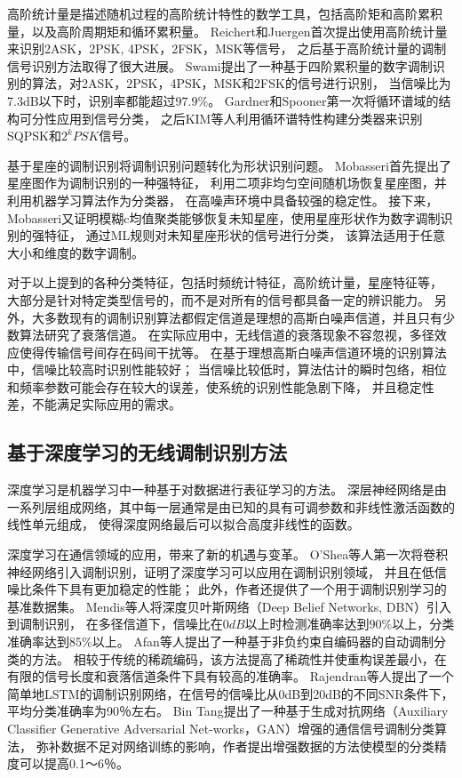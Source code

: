 高阶统计量是描述随机过程的高阶统计特性的数学工具，包括高阶矩和高阶累积量，以及高阶周期矩和循环累积量。
Reichert和Juergen首次提出使用高阶统计量来识别2ASK，2PSK, 4PSK，2FSK，MSK等信号，
之后基于高阶统计量的调制信号识别方法取得了很大进展\cite{reichert1992automatic}。
Swami提出了一种基于四阶累积量的数字调制识别的算法，对2ASK，2PSK，4PSK，MSK和2FSK的信号进行识别，
当信噪比为7.3dB以下时，识别率都能超过$97.9\%$\cite{swami2000hierarchical}。
Gardner和Spooner第一次将循环谱域的结构可分性应用到信号分类，
之后KIM等人利用循环谱特性构建分类器来识别SQPSK和$2^kPSK$信号。\par

基于星座的调制识别将调制识别问题转化为形状识别问题。
Mobasseri首先提出了星座图作为调制识别的一种强特征，
利用二项非均匀空间随机场恢复星座图，并利用机器学习算法作为分类器，
在高噪声环境中具备较强的稳定性\cite{mobasseri1999constellation}。
接下来，Mobasseri又证明模糊c均值聚类能够恢复未知星座，使用星座形状作为数字调制识别的强特征，
通过ML规则对未知星座形状的信号进行分类，
该算法适用于任意大小和维度的数字调制\cite{mobasseri2000digital}。\par
 
对于以上提到的各种分类特征，包括时频统计特征，高阶统计量，星座特征等，
大部分是针对特定类型信号的，而不是对所有的信号都具备一定的辨识能力。
另外，大多数现有的调制识别算法都假定信道是理想的高斯白噪声信道，并且只有少数算法研究了衰落信道。
在实际应用中，无线信道的衰落现象不容忽视，多径效应使得传输信号间存在码间干扰等。
在基于理想高斯白噪声信道环境的识别算法中，信噪比较高时识别性能较好；
当信噪比较低时，算法估计的瞬时包络，相位和频率参数可能会存在较大的误差，使系统的识别性能急剧下降，
并且稳定性差，不能满足实际应用的需求。\par

\subsection{基于深度学习的无线调制识别方法}

深度学习是机器学习中一种基于对数据进行表征学习的方法。
深层神经网络是由一系列层组成网络，其中每一层通常是由已知的具有可调参数和非线性激活函数的线性单元组成，
使得深度网络最后可以拟合高度非线性的函数。\par
深度学习在通信领域的应用，带来了新的机遇与变革。
O'Shea等人第一次将卷积神经网络引入调制识别，证明了深度学习可以应用在调制识别领域，
并且在低信噪比条件下具有更加稳定的性能\cite{o2016convolutional}；
此外，作者还提供了一个用于调制识别学习的基准数据集\cite{o2016radio}。
Mendis等人将深度贝叶斯网络（Deep Belief Networks, DBN）引入到调制识别，
在多径信道下，信噪比在$0dB$以上时检测准确率达到$90\%$以上，分类准确率达到$85\%$以上\cite{mendis2016deep}。
Afan等人提出了一种基于非负约束自编码器的自动调制分类的方法\cite{ali2017automatic}。
相较于传统的稀疏编码，该方法提高了稀疏性并使重构误差最小，在有限的信号长度和衰落信道条件下具有较高的准确率。
Rajendran等人提出了一个简单地LSTM的调制识别网络，在信号的信噪比从0dB到20dB的不同SNR条件下，
平均分类准确率为90％左右\cite{rajendran2017distributed}。
Bin Tang提出了一种基于生成对抗网络（Auxiliary Classifier Generative Adversarial Net-works，GAN）增强的通信信号调制分类算法，
弥补数据不足对网络训练的影响，作者提出增强数据的方法使模型的分类精度可以提高0.1〜6％。\cite{8319926}\par

